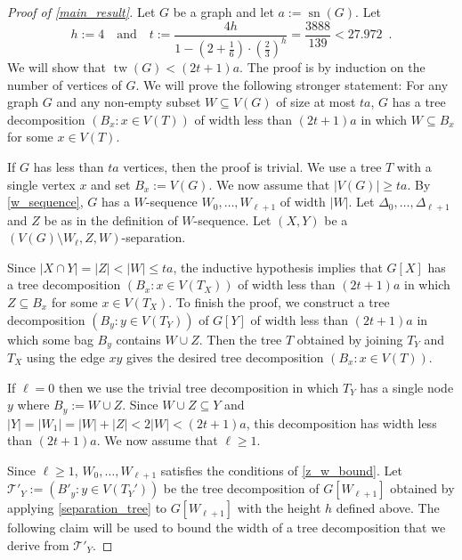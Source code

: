 \documentclass{patmorin}
\newcommand{\pat}[1]{\textcolor{Blue}{[Pat: #1]}}
\DeclareMathOperator{\sep}{sn}
\DeclareMathOperator{\tw}{tw}
\begin{document}
\begin{proof}[Proof of \cref{main_result}]
  Let $G$ be a graph and let $a:=\sep(G)$.  Let
  \[
    h:=4 \quad\text{and}\quad t:=\frac{4h}{1-(2+\tfrac{1}{6})\cdot(\tfrac{2}{3})^{h}} = \frac{3888}{139} < 27.972 \enspace .
  \]
  We will show that $\tw(G)< (2t+1)a$. The proof is by induction on the number of vertices of $G$. We will prove the following stronger statement: For any graph $G$ and any non-empty subset $W\subseteq V(G)$ of size at most $ta$, $G$ has a tree decomposition $(B_x:x\in V(T))$ of width less than $(2t+1)a$ in which $W\subseteq B_x$ for some $x\in V(T)$.

  If $G$ has less than $ta$ vertices, then the proof is trivial. We use a tree $T$ with a single vertex $x$ and set $B_x:=V(G)$.  We now assume that $|V(G)|\ge ta$.
  By \cref{w_sequence}, $G$ has a $W$-sequence $W_0,\ldots,W_{\ell+1}$ of width $|W|$.   Let $\Delta_0,\ldots,\Delta_{\ell+1}$ and $Z$ be as in the definition of $W$-sequence.  Let $(X,Y)$ be a $(V(G)\setminus W_{\ell},Z,W)$-separation.

  Since $|X\cap Y|=|Z|<|W|\le ta$, the inductive hypothesis implies that $G[X]$ has a tree decomposition $(B_x:x\in V(T_X))$ of width less than $(2t+1)a$ in which $Z\subseteq B_x$ for some $x \in V(T_X)$. To finish the proof, we construct a tree decomposition $(B_y:y\in V(T_Y))$ of $G[Y]$ of width less than $(2t+1)a$ in which some bag $B_{y}$ contains $W\cup Z$.  Then the tree $T$ obtained by joining $T_Y$ and $T_X$ using the edge $x y$ gives the desired tree decomposition $(B_x:x\in V(T))$.

  If $\ell=0$ then we use the trivial tree decomposition in which $T_Y$ has a single node $y$ where $B_{y}:=W\cup Z$.  Since $W\cup Z\subseteq Y$ and $|Y|=|W_1|=|W|+|Z|< 2|W|<(2t+1)a$, this decomposition has width less than $(2t+1)a$. We now assume that $\ell \ge  1$.



  Since $\ell \ge 1$, $W_0,\ldots,W_{\ell+1}$ satisfies the conditions of \cref{z_w_bound}.
  Let $\mathcal{T}'_Y:=(B'_y:y\in V(T_Y'))$ be the tree decomposition of $G[W_{\ell+1}]$ obtained by applying \cref{separation_tree} to $G[W_{\ell+1}]$ with the height $h$ defined above.  The following claim will be used to bound the width of a tree decomposition that we derive from $\mathcal{T}'_Y$.


\end{proof}
\end{document}
